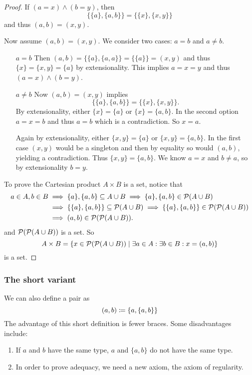 \begin{proof}
If $(a=x)\land (b=y)$, then
\[ \{\{a\},\{a,b\}\} = \{\{x\},\{x,y\}\} \]
and thus $(a,b) = (x,y)$.

Now assume $(a,b) = (x,y)$. We consider two cases: $a=b$ and $a\neq b$.
\begin{itemize}[leftmargin=2cm]
\item[$\boxed{a=b}$] Then $(a,b) = \{\{a\},\{a,a\}\} = \{\{a\}\} = (x,y)$ and thus $\{x\} = \{x,y\} = \{a\}$ by extensionality. This implies $a=x=y$ and thus $(a=x)\land (b=y)$.
\item[$\boxed{a\neq b}$] Now $(a,b) = (x,y)$ implies
\[ \{\{a\},\{a,b\}\} = \{\{x\},\{x,y\}\}. \]
By extensionality, either $\{x\} = \{a\}$ or $\{x\} = \{a,b\}$. In the second option $a=x=b$ and thus $a=b$ which is a contradiction. So $x=a$.

Again by extensionality, either $\{x,y\} = \{a\}$ or $\{x,y\} = \{a,b\}$. In the first case $(x,y)$ would be a singleton and then by equality so would $(a,b)$, yielding a contradiction. Thus $\{x,y\} = \{a,b\}$. We know $a=x$ and $b\neq a$, so by extensionality $b=y$.
\end{itemize}
To prove the Cartesian product $A\times B$ is a set, notice that
\begin{align*}
a\in A, b\in B &\implies \{a\},\{a,b\}\subseteq A\cup B \implies \{a\},\{a,b\}\in \operatorname{\mathcal{P}}(A\cup B)\\
&\implies \{\{a\},\{a,b\}\}\subseteq \operatorname{\mathcal{P}}(A\cup B) \implies \{\{a\},\{a,b\}\}\in \operatorname{\mathcal{P}}(\operatorname{\mathcal{P}}(A\cup B)) \\
&\implies (a,b) \in \operatorname{\mathcal{P}}(\operatorname{\mathcal{P}}(A\cup B)).
\end{align*}
and $\operatorname{\mathcal{P}}(\operatorname{\mathcal{P}}(A\cup B))$ is a set. So
\[ A\times B = \{ x\in \operatorname{\mathcal{P}}(\operatorname{\mathcal{P}}(A\cup B))\;|\; \exists a\in A:\exists b\in B: x = (a,b) \} \]
is a set.
\end{proof}
\subsubsection{The short variant}
We can also define a pair as
\[ (a,b) \coloneqq \{a,\{a,b\}\} \]
The advantage of this short definition is fewer braces. Some disadvantages include:
\begin{enumerate}
\item If $a$ and $b$ have the same type, $a$ and $\{a,b\}$ do not have the same type.
\item In order to prove adequacy, we need a new axiom, the axiom of regularity.
\end{enumerate}
